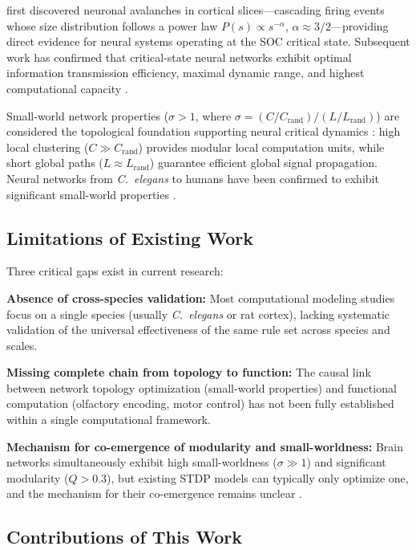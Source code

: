 \documentclass[12pt,a4paper]{article}
\begin{document}
\citet{beggs2003} first discovered neuronal avalanches in cortical slices---cascading firing events whose size distribution follows a power law $P(s) \propto s^{-\alpha}$, $\alpha \approx 3/2$---providing direct evidence for neural systems operating at the SOC critical state. Subsequent work has confirmed that critical-state neural networks exhibit optimal information transmission efficiency, maximal dynamic range, and highest computational capacity \citep{shew2013}.

Small-world network properties ($\sigma > 1$, where $\sigma = (C/C_{\text{rand}})/(L/L_{\text{rand}})$) are considered the topological foundation supporting neural critical dynamics \citep{watts1998, sporns2004}: high local clustering ($C \gg C_{\text{rand}}$) provides modular local computation units, while short global paths ($L \approx L_{\text{rand}}$) guarantee efficient global signal propagation. Neural networks from \textit{C.\ elegans} to humans have been confirmed to exhibit significant small-world properties \citep{bassett2006}.

\subsection{Limitations of Existing Work}

Three critical gaps exist in current research:

\textbf{Absence of cross-species validation:} Most computational modeling studies focus on a single species (usually \textit{C.\ elegans} or rat cortex), lacking systematic validation of the universal effectiveness of the same rule set across species and scales.

\textbf{Missing complete chain from topology to function:} The causal link between network topology optimization (small-world properties) and functional computation (olfactory encoding, motor control) has not been fully established within a single computational framework.

\textbf{Mechanism for co-emergence of modularity and small-worldness:} Brain networks simultaneously exhibit high small-worldness ($\sigma \gg 1$) and significant modularity ($Q > 0.3$), but existing STDP models can typically only optimize one, and the mechanism for their co-emergence remains unclear \citep{meunier2010}.

\subsection{Contributions of This Work}
\end{document}

